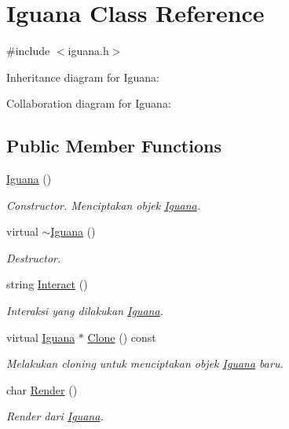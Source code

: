 \hypertarget{classIguana}{}\section{Iguana Class Reference}
\label{classIguana}


{\ttfamily \#include $<$iguana.\+h$>$}



Inheritance diagram for Iguana\+:


Collaboration diagram for Iguana\+:
\subsection*{Public Member Functions}
\begin{DoxyCompactItemize}
\item 
\hyperlink{classIguana_aadc10a5bb8364d915bfd1d3d8ab3156a}{Iguana} ()
\begin{DoxyCompactList}\small\item\em Constructor. Menciptakan objek \hyperlink{classIguana}{Iguana}. \end{DoxyCompactList}\item 
virtual \hyperlink{classIguana_af0a4082cc22aea6f76f42c859d9375ad}{$\sim$\+Iguana} ()
\begin{DoxyCompactList}\small\item\em Destructor. \end{DoxyCompactList}\item 
string \hyperlink{classIguana_a271ef320fd3d4973e50e89aa30cffe3e}{Interact} ()
\begin{DoxyCompactList}\small\item\em Interaksi yang dilakukan \hyperlink{classIguana}{Iguana}. \end{DoxyCompactList}\item 
virtual \hyperlink{classIguana}{Iguana} $\ast$ \hyperlink{classIguana_a40e56fb855d09d2a8788dc73e2fdfc8a}{Clone} () const 
\begin{DoxyCompactList}\small\item\em Melakukan cloning untuk menciptakan objek \hyperlink{classIguana}{Iguana} baru. \end{DoxyCompactList}\item 
char \hyperlink{classIguana_a18bbb71a80e6b2a9855623b1c7f108b9}{Render} ()
\begin{DoxyCompactList}\small\item\em Render dari \hyperlink{classIguana}{Iguana}. \end{DoxyCompactList}\end{DoxyCompactItemize}
